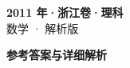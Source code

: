 \documentclass[zihao=-4, a4paper]{ctexart}
\begin{document}
\begin{center}
  {\Large\bfseries 2011 年·浙江卷·理科}\\[4pt]
  {\large 数学 · 解析版}
\end{center}
\medskip
{}

\clearpage
{}
\begin{center}{\Large\bfseries 参考答案与详细解析}\end{center}
\medskip

\end{document}

